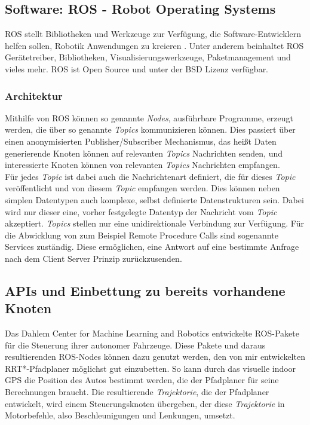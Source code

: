 \subsection{Software: ROS - Robot Operating Systems}
ROS stellt Bibliotheken und Werkzeuge zur Verfügung, die Software-Entwicklern helfen sollen, Robotik Anwendungen zu kreieren \citep{ROS}. Unter anderem beinhaltet ROS Gerätetreiber, Bibliotheken, Visualisierungswerkzeuge, Paketmanagement und vieles mehr. ROS ist Open Source und unter der BSD Lizenz verfügbar.
\subsubsection{Architektur}
Mithilfe von ROS können so genannte \textit{Nodes}, ausführbare Programme, erzeugt werden, die über so genannte \textit{Topics} kommunizieren können. Dies passiert über einen anonymisierten Publisher/Subscriber Mechanismus, das heißt Daten generierende Knoten können auf relevanten \textit{Topics} Nachrichten senden, und interessierte Knoten können von relevanten \textit{Topics} Nachrichten empfangen. \\
Für jedes \textit{Topic} ist dabei auch die Nachrichtenart definiert, die für dieses \textit{Topic} veröffentlicht und von diesem \textit{Topic} empfangen werden. Dies können neben simplen Datentypen auch komplexe, selbst definierte Datenstrukturen sein. Dabei wird nur dieser eine, vorher festgelegte Datentyp der Nachricht vom \textit{Topic} akzeptiert.
\textit{Topics} stellen nur eine unidirektionale Verbindung zur Verfügung. Für die Abwicklung von zum Beispiel Remote Procedure Calls sind sogenannte Services zuständig. Diese ermöglichen, eine Antwort auf eine bestimmte Anfrage nach dem Client Server Prinzip zurückzusenden.
\subsection{APIs und Einbettung zu bereits vorhandene Knoten}
Das Dahlem Center for Machine Learning and Robotics entwickelte ROS-Pakete für die Steuerung ihrer autonomer Fahrzeuge. Diese Pakete und daraus resultierenden ROS-Nodes können dazu genutzt werden, den von mir entwickelten RRT*-Pfadplaner möglichst gut einzubetten. So kann durch das visuelle indoor GPS die Position des Autos bestimmt werden, die der Pfadplaner für seine Berechnungen braucht. Die resultierende \textit{Trajektorie}, die der Pfadplaner entwickelt, wird einem Steuerungsknoten übergeben, der diese \textit{Trajektorie} in Motorbefehle, also Beschleunigungen und Lenkungen, umsetzt. 
